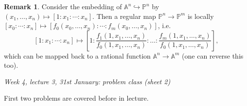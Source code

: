 \documentclass{article}
\newcommand{\A}{\mathbb{A}}
\newcommand{\p}{\mathbb{P}}
\theoremstyle{definition}
\newtheorem{remark}[defn]{Remark}
\begin{document}
\begin{remark}
Consider the embedding of $\A^n\hookrightarrow\p^n$ by $(x_1,\ldots,x_n)\mapsto [1:x_1:\cdots:x_n]$. Then a regular map $\p^n\rightarrow\p^m$ is locally $[x_0:\cdots:x_n]\mapsto\left[f_0(x_0,\ldots,x_n):\cdots:f_m(x_0,\ldots,x_n)\right]$, i.e.
\[
[1:x_1:\cdots:x_n]\mapsto\left[1:\frac{f_1(1,x_1,\ldots,x_n)}{f_0(1,x_1,\ldots,x_n)}:\ldots:\frac{f_m(1,x_1,\ldots,x_n)}{f_0(1,x_1,\ldots,x_n)}\right],
\]
which can be mapped back to a rational function $\A^n\rightarrow\A^m$ (one can reverse this too).
\end{remark}

\begin{flushright}
\textit{Week 4, lecture 3, 31st January: problem class (sheet 2)}
\end{flushright}

First two problems are covered before in lecture.
\end{document}
